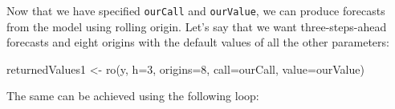 \documentclass[
]{book}
\newenvironment{Shaded}{\begin{snugshade}}{\end{snugshade}}
\newcommand{\AttributeTok}[1]{\textcolor[rgb]{0.77,0.63,0.00}{#1}}
\newcommand{\DecValTok}[1]{\textcolor[rgb]{0.00,0.00,0.81}{#1}}
\newcommand{\FunctionTok}[1]{\textcolor[rgb]{0.00,0.00,0.00}{#1}}
\newcommand{\NormalTok}[1]{#1}
\newcommand{\OtherTok}[1]{\textcolor[rgb]{0.56,0.35,0.01}{#1}}
\theoremstyle{definition}
\theoremstyle{definition}
\theoremstyle{definition}
\theoremstyle{definition}
\theoremstyle{remark}
\begin{document}
Now that we have specified \texttt{ourCall} and \texttt{ourValue}, we can produce forecasts from the model using rolling origin. Let's say that we want three-steps-ahead forecasts and eight origins with the default values of all the other parameters:

\begin{Shaded}
\begin{Highlighting}[]
\NormalTok{returnedValues1 }\OtherTok{\textless{}{-}} \FunctionTok{ro}\NormalTok{(y, }\AttributeTok{h=}\DecValTok{3}\NormalTok{, }\AttributeTok{origins=}\DecValTok{8}\NormalTok{,}
                      \AttributeTok{call=}\NormalTok{ourCall, }\AttributeTok{value=}\NormalTok{ourValue)}
\end{Highlighting}
\end{Shaded}

The same can be achieved using the following loop:
\end{document}

